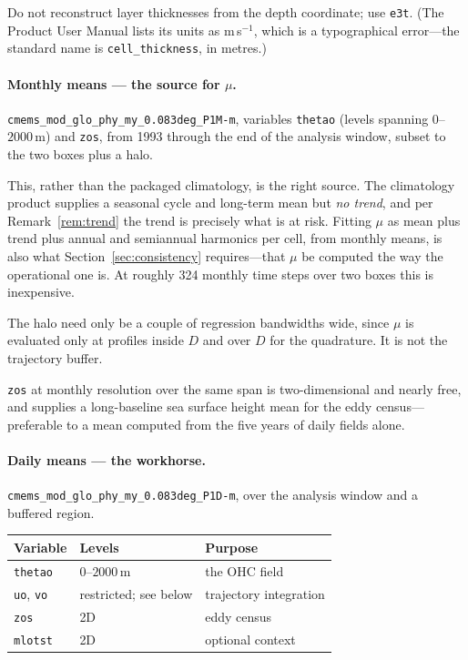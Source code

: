 \documentclass[11pt]{article}
\begin{document}
Do not reconstruct layer thicknesses from the depth coordinate; use \texttt{e3t}. (The Product
User Manual lists its units as m\,s$^{-1}$, which is a typographical error---the standard name
is \texttt{cell\_thickness}, in metres.)

\paragraph{Monthly means --- the source for $\mu$.}
\texttt{cmems\_mod\_glo\_phy\_my\_0.083deg\_P1M-m}, variables \texttt{thetao} (levels spanning
$0$--$2000$\,m) and \texttt{zos}, from 1993 through the end of the analysis window, subset to
the two boxes plus a halo.

This, rather than the packaged climatology, is the right source. The climatology product
supplies a seasonal cycle and long-term mean but \emph{no trend}, and per
Remark~\ref{rem:trend} the trend is precisely what is at risk. Fitting $\mu$ as mean plus trend
plus annual and semiannual harmonics per cell, from monthly means, is also what
Section~\ref{sec:consistency} requires---that $\mu$ be computed the way the operational one is.
At roughly 324 monthly time steps over two boxes this is inexpensive.

The halo need only be a couple of regression bandwidths wide, since $\mu$ is evaluated only at
profiles inside $D$ and over $D$ for the quadrature. It is not the trajectory buffer.

\texttt{zos} at monthly resolution over the same span is two-dimensional and nearly free, and
supplies a long-baseline sea surface height mean for the eddy census---preferable to a mean
computed from the five years of daily fields alone.

\paragraph{Daily means --- the workhorse.}
\texttt{cmems\_mod\_glo\_phy\_my\_0.083deg\_P1D-m}, over the analysis window and a buffered
region.

\begin{table}[h]
\centering
\begin{tabular}{lll}
\toprule
Variable & Levels & Purpose \\
\midrule
\texttt{thetao} & $0$--$2000$\,m & the OHC field \\
\texttt{uo}, \texttt{vo} & restricted; see below & trajectory integration \\
\texttt{zos} & 2D & eddy census \\
\texttt{mlotst} & 2D & optional context \\
\bottomrule
\end{tabular}
\end{table}
\end{document}
